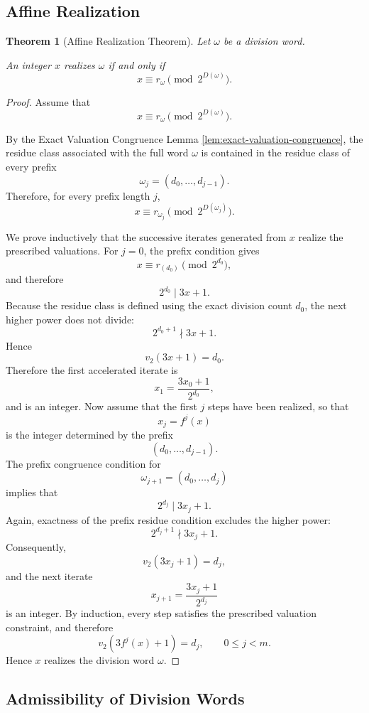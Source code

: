 \documentclass[12pt, oneside]{article}
\numberwithin{equation}{section}
\theoremstyle{definition}
\theoremstyle{plain}
\newtheorem{theorem}{Theorem}[section]
\theoremstyle{remark}
\begin{document}
\subsection{Affine Realization}

\begin{theorem}[Affine Realization Theorem]
Let $\omega$ be a division word.

An integer $x$ realizes $\omega$ if and only if
\[
x\equiv r_\omega\pmod{2^{D(\omega)}}.
\]

\end{theorem}

\begin{proof}
Assume that
\[
x\equiv r_\omega \pmod{2^{D(\omega)}}.
\]

By the Exact Valuation Congruence Lemma \ref{lem:exact-valuation-congruence},
the residue class associated with the full word $\omega$ is contained in the residue
class of every prefix
\[
\omega_j=(d_0,\dots,d_{j-1}).
\]
Therefore, for every prefix length $j$,
\[
x\equiv r_{\omega_j}\pmod{2^{D(\omega_j)}}.
\]

We prove inductively that the successive iterates generated from $x$ realize
the prescribed valuations.  For $j=0$, the prefix condition gives
\[
x\equiv r_{(d_0)}\pmod{2^{d_0}},
\]
and therefore
\[
2^{d_0}\mid 3x+1.
\]
Because the residue class is defined using the exact division count $d_0$,
the next higher power does not divide:
\[
2^{d_0+1}\nmid 3x+1.
\]
Hence
\[
v_2(3x+1)=d_0.
\]
Therefore the first accelerated iterate is
\[
x_1=\frac{3x_0+1}{2^{d_0}},
\]
and is an integer.  Now assume that the first $j$ steps have been realized, so that
\[
x_j=f^j(x)
\]
is the integer determined by the prefix
\[
(d_0,\dots,d_{j-1}).
\]
The prefix congruence condition for
\[
\omega_{j+1}=(d_0,\dots,d_j)
\]
implies that
\[
2^{d_j}\mid 3x_j+1.
\]
Again, exactness of the prefix residue condition excludes the higher power:
\[
2^{d_j+1}\nmid 3x_j+1.
\]
Consequently,
\[
v_2(3x_j+1)=d_j,
\]
and the next iterate
\[
x_{j+1}=\frac{3x_j+1}{2^{d_j}}
\]
is an integer.  By induction, every step satisfies the prescribed valuation
constraint, and therefore
\[
v_2(3f^j(x)+1)=d_j,
\qquad 0\le j<m.
\]
Hence $x$ realizes the division word $\omega$.
\end{proof}

\subsection{Admissibility of Division Words}
\end{document}
